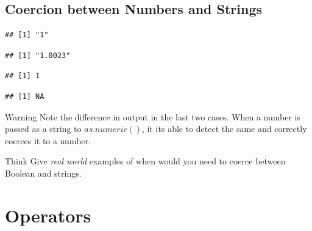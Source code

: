 \subsection{Coercion between Numbers and Strings}
\begin{knitrout}
\color{fgcolor}\begin{kframe}
\begin{alltt}
\hlstd{(}\hlstd{)} 
\end{alltt}
\begin{verbatim}
## [1] "1"
\end{verbatim}
\begin{alltt}
\hlstd{(}\hlstd{)} 
\end{alltt}
\begin{verbatim}
## [1] "1.0023"
\end{verbatim}
\begin{alltt}
\hlstd{(}\hlstd{)} 
\end{alltt}
\begin{verbatim}
## [1] 1
\end{verbatim}
\begin{alltt}
\hlstd{(}\hlstd{)} 
\end{alltt}


{\ttfamily\noindent\color{warningcolor}{\#\# Warning: NAs introduced by coercion}}\begin{verbatim}
## [1] NA
\end{verbatim}
\end{kframe}
\end{knitrout}
\begin{DIY}{Warning}
Note the difference in output in the last two cases. When a number is passed as a string to $as.numeric()$, it its able to detect the same and correctly coerces it to a number. 
\end{DIY}

\begin{DIY}{Think}
Give \emph{real world} examples of when would you need to coerce between Boolean and strings.
\end{DIY}


\section{Operators}
\begin{HIGHLIGHT}
\par{}
\end{HIGHLIGHT}

